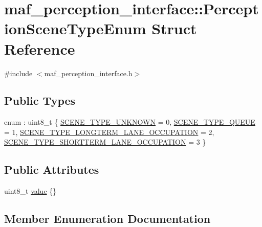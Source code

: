 \hypertarget{structmaf__perception__interface_1_1PerceptionSceneTypeEnum}{}\section{maf\+\_\+perception\+\_\+interface\+:\+:Perception\+Scene\+Type\+Enum Struct Reference}
\label{structmaf__perception__interface_1_1PerceptionSceneTypeEnum}


{\ttfamily \#include $<$maf\+\_\+perception\+\_\+interface.\+h$>$}

\subsection*{Public Types}
\begin{DoxyCompactItemize}
\item 
enum \+: uint8\+\_\+t \{ \hyperlink{structmaf__perception__interface_1_1PerceptionSceneTypeEnum_aebc0ca89be8722931b93fbb2bc7336faa64b49b0193a752a1ffd11b1bd6fbbc60}{S\+C\+E\+N\+E\+\_\+\+T\+Y\+P\+E\+\_\+\+U\+N\+K\+N\+O\+WN} = 0, 
\hyperlink{structmaf__perception__interface_1_1PerceptionSceneTypeEnum_aebc0ca89be8722931b93fbb2bc7336faa2c4b20050b951a6d1a8b1229599db85c}{S\+C\+E\+N\+E\+\_\+\+T\+Y\+P\+E\+\_\+\+Q\+U\+E\+UE} = 1, 
\hyperlink{structmaf__perception__interface_1_1PerceptionSceneTypeEnum_aebc0ca89be8722931b93fbb2bc7336faaf59f9c9c5d831e614e9ad18efdd5af40}{S\+C\+E\+N\+E\+\_\+\+T\+Y\+P\+E\+\_\+\+L\+O\+N\+G\+T\+E\+R\+M\+\_\+\+L\+A\+N\+E\+\_\+\+O\+C\+C\+U\+P\+A\+T\+I\+ON} = 2, 
\hyperlink{structmaf__perception__interface_1_1PerceptionSceneTypeEnum_aebc0ca89be8722931b93fbb2bc7336faa0ed9dc72448cfec08dcc390729d0ddd1}{S\+C\+E\+N\+E\+\_\+\+T\+Y\+P\+E\+\_\+\+S\+H\+O\+R\+T\+T\+E\+R\+M\+\_\+\+L\+A\+N\+E\+\_\+\+O\+C\+C\+U\+P\+A\+T\+I\+ON} = 3
 \}
\end{DoxyCompactItemize}
\subsection*{Public Attributes}
\begin{DoxyCompactItemize}
\item 
uint8\+\_\+t \hyperlink{structmaf__perception__interface_1_1PerceptionSceneTypeEnum_a62144d1b6bb2b92e7b466ad58f263adb}{value} \{\}
\end{DoxyCompactItemize}


\subsection{Member Enumeration Documentation}
\mbox{\label{structmaf__perception__interface_1_1PerceptionSceneTypeEnum_aebc0ca89be8722931b93fbb2bc7336fa}} 
